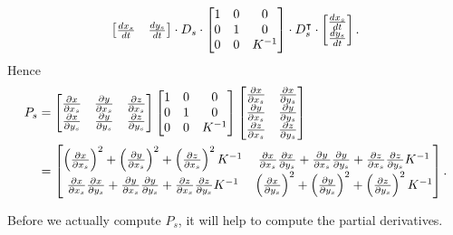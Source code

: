 \documentclass[newpage,hints,handout]{ximera}
\begin{document}
\begin{problem}
\begin{freeResponse}
\begin{align*}
\begin{bmatrix}
      \frac{dx_s}{dt} & \frac{dy_s}{dt}
    \end{bmatrix}\cdot D_{s}\cdot
    \begin{bmatrix}
      1 & 0 & 0\\
      0 & 1 & 0\\
    0 & 0 & K^{-1}
    \end{bmatrix}
    \cdot
    D_{s}^\transpose
    \cdot \begin{bmatrix}
      \frac{dx_s}{dt} \\ \frac{dy_s}{dt}
    \end{bmatrix}.
  \end{align*}
    Hence
    \begin{align*}
      P_s &=
      \begin{bmatrix}
        \pp[x]{x_s} & \pp[y]{x_s} & \pp[z]{x_s} \\
        \pp[x]{y_s} & \pp[y]{y_s} & \pp[z]{y_s}
      \end{bmatrix}
      \begin{bmatrix}
        1 & 0 & 0\\
        0 & 1 & 0\\
        0 & 0 & K^{-1}
      \end{bmatrix}
      \begin{bmatrix}
        \pp[x]{x_s} & \pp[x]{y_s}\\ 
        \pp[y]{x_s} & \pp[y]{y_s}\\
        \pp[z]{x_s} & \pp[z]{y_s}
      \end{bmatrix}\\
      &=
      \begin{bmatrix}
        \left(\pp[x]{x_s}\right)^2 + \left(\pp[y]{x_s}\right)^2 + \left(\pp[z]{x_s}\right)^2K^{-1} & \pp[x]{x_s}\pp[x]{y_s} + \pp[y]{x_s}\pp[y]{y_s} + \pp[z]{x_s}\pp[z]{y_s} K^{-1}\\
        \pp[x]{x_s}\pp[x]{y_s} + \pp[y]{x_s}\pp[y]{y_s} + \pp[z]{x_s}\pp[z]{y_s} K^{-1}       & \left(\pp[x]{y_s}\right)^2 + \left(\pp[y]{y_s}\right)^2 + \left(\pp[z]{y_s}\right)^2K^{-1}
      \end{bmatrix}.
    \end{align*}
  \end{freeResponse}
\end{problem}


Before we actually compute $P_s$, it will help to compute the partial
derivatives.
\end{document}
